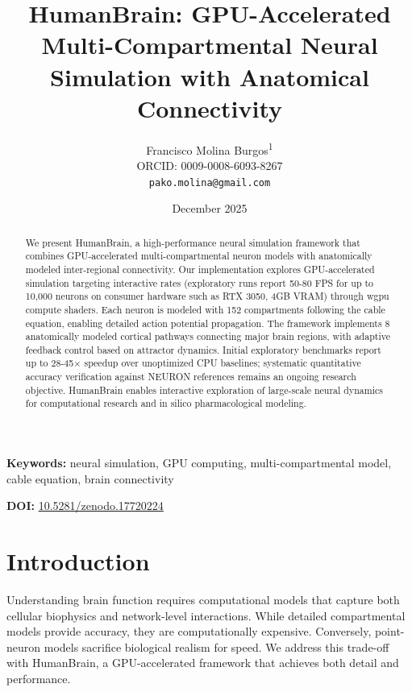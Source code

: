 \documentclass[11pt,twocolumn]{article}
\title{HumanBrain: GPU-Accelerated Multi-Compartmental Neural Simulation with Anatomical Connectivity}
\author{
    Francisco Molina Burgos\textsuperscript{1}\\
    \small ORCID: 0009-0008-6093-8267\\
    \small \texttt{pako.molina@gmail.com}
}
\date{December 2025}
\begin{document}
\maketitle

\begin{abstract}
We present HumanBrain, a high-performance neural simulation framework that combines GPU-accelerated multi-compartmental neuron models with anatomically modeled inter-regional connectivity. Our implementation explores GPU-accelerated simulation targeting interactive rates (exploratory runs report 50-80 FPS for up to 10,000 neurons on consumer hardware such as RTX 3050, 4GB VRAM) through wgpu compute shaders. Each neuron is modeled with 152 compartments following the cable equation, enabling detailed action potential propagation. The framework implements 8 anatomically modeled cortical pathways connecting major brain regions, with adaptive feedback control based on attractor dynamics. Initial exploratory benchmarks report up to 28-45× speedup over unoptimized CPU baselines; systematic quantitative accuracy verification against NEURON references remains an ongoing research objective. HumanBrain enables interactive exploration of large-scale neural dynamics for computational research and in silico pharmacological modeling.
\end{abstract}

\textbf{Keywords:} neural simulation, GPU computing, multi-compartmental model, cable equation, brain connectivity

\noindent\textbf{DOI:} \href{https://doi.org/10.5281/zenodo.17720224}{10.5281/zenodo.17720224}

\section{Introduction}

Understanding brain function requires computational models that capture both cellular biophysics and network-level interactions. While detailed compartmental models provide accuracy, they are computationally expensive. Conversely, point-neuron models sacrifice biological realism for speed. We address this trade-off with HumanBrain, a GPU-accelerated framework that achieves both detail and performance.
\end{document}
